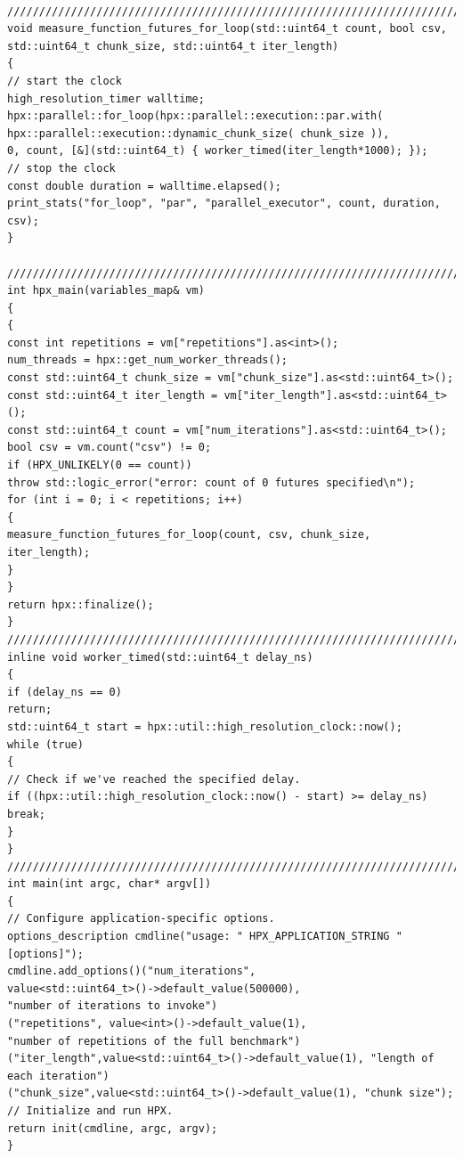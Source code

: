 \begin{lstlisting}[basicstyle=\fontsize{8}{9}\selectfont,float,floatplacement=H,caption= {A simple hpx for\textunderscore{loop} used to study the effect of grain size on the achieved parallelism.}, label={hpx_for_loop}]

///////////////////////////////////////////////////////////////////////////////
void measure_function_futures_for_loop(std::uint64_t count, bool csv, std::uint64_t chunk_size, std::uint64_t iter_length)
{
// start the clock
high_resolution_timer walltime;
hpx::parallel::for_loop(hpx::parallel::execution::par.with(
hpx::parallel::execution::dynamic_chunk_size( chunk_size )),
0, count, [&](std::uint64_t) { worker_timed(iter_length*1000); });
// stop the clock
const double duration = walltime.elapsed();
print_stats("for_loop", "par", "parallel_executor", count, duration, csv);
}

///////////////////////////////////////////////////////////////////////////////
int hpx_main(variables_map& vm)
{
{
const int repetitions = vm["repetitions"].as<int>();
num_threads = hpx::get_num_worker_threads();
const std::uint64_t chunk_size = vm["chunk_size"].as<std::uint64_t>();
const std::uint64_t iter_length = vm["iter_length"].as<std::uint64_t>();
const std::uint64_t count = vm["num_iterations"].as<std::uint64_t>();
bool csv = vm.count("csv") != 0;
if (HPX_UNLIKELY(0 == count))
throw std::logic_error("error: count of 0 futures specified\n");
for (int i = 0; i < repetitions; i++)
{
measure_function_futures_for_loop(count, csv, chunk_size, iter_length);
}
}
return hpx::finalize();
}
///////////////////////////////////////////////////////////////////////////////
inline void worker_timed(std::uint64_t delay_ns)
{
if (delay_ns == 0)
return;
std::uint64_t start = hpx::util::high_resolution_clock::now();
while (true)
{
// Check if we've reached the specified delay.
if ((hpx::util::high_resolution_clock::now() - start) >= delay_ns)
break;
}
}
///////////////////////////////////////////////////////////////////////////////
int main(int argc, char* argv[])
{
// Configure application-specific options.
options_description cmdline("usage: " HPX_APPLICATION_STRING " [options]");
cmdline.add_options()("num_iterations",
value<std::uint64_t>()->default_value(500000),
"number of iterations to invoke")
("repetitions", value<int>()->default_value(1),
"number of repetitions of the full benchmark")
("iter_length",value<std::uint64_t>()->default_value(1), "length of each iteration")
("chunk_size",value<std::uint64_t>()->default_value(1), "chunk size");
// Initialize and run HPX.
return init(cmdline, argc, argv);
}
\end{lstlisting}

